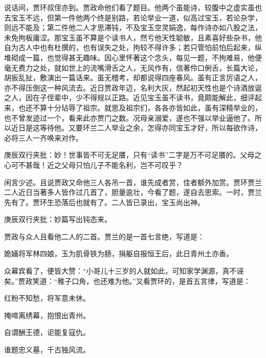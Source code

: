 \begin{parag}
    说话间，贾环叔侄亦到。贾政命他们看了题目。他两个虽能诗，较腹中之虚实虽也去宝玉不远，但第一件他两个终是别路，若论举业一道，似高过宝玉，若论杂学，则远不能及；第二件他二人才思滞钝，不及宝玉空灵娟逸，每作诗亦如八股之法，未免拘板庸涩。那宝玉虽不算是个读书人，然亏他天性聪敏，且素喜好些杂书，他自为古人中也有杜撰的，也有误失之处，拘较不得许多；若只管怕前怕后起来，纵堆砌成一篇，也觉得甚无趣味。因心里怀著这个念头，每见一题，不拘难易，他便毫无费力之处，就如世上的流嘴滑舌之人，无风作有，信著伶口俐舌，长篇大论，胡扳乱扯，敷演出一篇话来。虽无稽考，却都说得四座春风。虽有正言厉语之人，亦不得压倒这一种风流去。近日贾政年迈，名利大灰，然起初天性也是个诗酒放诞之人，因在子侄辈中，少不得规以正路。近见宝玉虽不读书，竟颇能解此，细评起来，也还不算十分玷辱了祖宗。就思及祖宗们，各各亦皆如此，虽有深精举业的，也不曾发迹过一个，看来此亦贾门之数。况母亲溺爱，遂也不强以举业逼他了。所以近日是这等待他。又要环兰二人举业之余，怎得亦同宝玉才好，所以每欲作诗，必将三人一齐唤来对作。\begin{note}庚辰双行夹批：妙！世事皆不可无足餍，只有“读书”二字是万不可足餍的。父母之心可不甚哉！近之父母只怕儿子不能名利，岂不可叹乎？\end{note}
\end{parag}


\begin{parag}
    闲言少述。且说贾政又命他三人各吊一首，谁先成者赏，佳者额外加赏。贾环贾兰二人近日当著多人皆作过几首了，胆量逾壮，今看了题，遂自去思索。一时，贾兰先有了。贾环生恐落后也就有了。二人皆已录出，宝玉尚出神。\begin{note}庚辰双行夹批：妙篇写出钝态来。\end{note}贾政与众人且看他二人的二首。贾兰的是一首七言绝，写道是：
\end{parag}
\begin{poem}
    \begin{pl}
        姽婳将军林四娘，玉为肌骨铁为肠，捐躯自报恒王后，此日青州土亦香。
    \end{pl}
\end{poem}


\begin{parag}
    众幕宾看了，便皆大赞：“小哥儿十三岁的人就如此，可知家学渊源，真不诬矣。”贾政笑道：“稚子口角，也还难为他。”又看贾环的，是首五言律，写道是：
\end{parag}
\begin{poem}

    \begin{pl}
        红粉不知愁，将军意未休。
    \end{pl}
    \begin{pl}
        掩啼离绣幕，抱恨出青州。
    \end{pl}
    \begin{pl}
        自谓酬王德，讵能复寇仇。
    \end{pl}
    \begin{pl}
        谁题忠义墓，千古独风流。
    \end{pl}

\end{poem}


